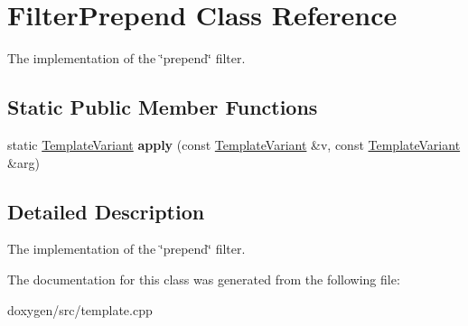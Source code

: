 \hypertarget{class_filter_prepend}{}\section{Filter\+Prepend Class Reference}
\label{class_filter_prepend}


The implementation of the \char`\"{}prepend\char`\"{} filter.  


\subsection*{Static Public Member Functions}
\begin{DoxyCompactItemize}
\item 
\mbox{\label{class_filter_prepend_a6496b4d65f311fab27e1ecdf9737f941}} 
static \mbox{\hyperlink{class_template_variant}{Template\+Variant}} {\bfseries apply} (const \mbox{\hyperlink{class_template_variant}{Template\+Variant}} \&v, const \mbox{\hyperlink{class_template_variant}{Template\+Variant}} \&arg)
\end{DoxyCompactItemize}


\subsection{Detailed Description}
The implementation of the \char`\"{}prepend\char`\"{} filter. 

The documentation for this class was generated from the following file\+:\begin{DoxyCompactItemize}
\item 
doxygen/src/template.\+cpp\end{DoxyCompactItemize}
